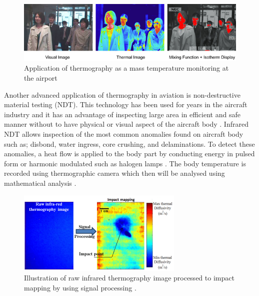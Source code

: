 \begin{figure}[!ht]
    \centering
    \includegraphics[scale=0.6]{Figures/IR_airport.jpg}
    \caption{Application of thermography as a mass temperature monitoring at the airport \cite{AnonymousBodyCO.LTD.}}
    \label{fig:airport_IR}
\end{figure}

\noindent Another advanced application of thermography in aviation is non-destructive material testing (NDT). This technology has been used for years in the aircraft industry and it has an advantage of inspecting large area in efficient and safe manner without to have physical or visual aspect of the aircraft body \cite{Ibarra-CastanedoInfraredMaterials}. Infrared NDT allows inspection of  the most common anomalies found on aircraft body such as; disbond, water ingress, core crushing, and delaminations. To detect these anomalies, a heat flow is applied to the body part by conducting energy in pulsed form or harmonic modulated such as halogen lamps \cite{Stumper2015ThermalAviation}. The body temperature is recorded using thermographic camera which then will be analysed using mathematical analysis \cite{Anonymous2013InformationImprovement}.

\begin{figure}[!ht]
    \centering
    \includegraphics[scale=1.2]{Figures/IR_NDT.png}
    \caption{Illustration of raw infrared thermography image processed to impact mapping by using signal processing \cite{Non-destructiveLab}.}
    \label{fig:ndt_av}
\end{figure}
 

